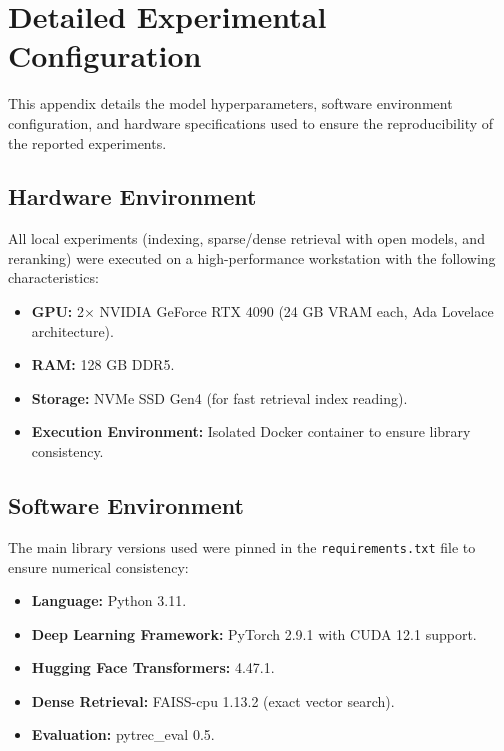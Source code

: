 \documentclass[11pt]{article}
\begin{document}
%


\appendix
\section{Detailed Experimental Configuration}
\label{apx:configuracion}

This appendix details the model hyperparameters, software environment configuration, and hardware specifications used to ensure the reproducibility of the reported experiments.

\subsection{Hardware Environment}

All local experiments (indexing, sparse/dense retrieval with open models, and reranking) were executed on a high-performance workstation with the following characteristics:

\begin{itemize}[nosep]
    \item \textbf{GPU:} 2$\times$ NVIDIA GeForce RTX 4090 (24 GB VRAM each, Ada Lovelace architecture).
    \item \textbf{RAM:} 128 GB DDR5.
    \item \textbf{Storage:} NVMe SSD Gen4 (for fast retrieval index reading).
    \item \textbf{Execution Environment:} Isolated Docker container to ensure library consistency.
\end{itemize}

\subsection{Software Environment}

The main library versions used were pinned in the \texttt{requirements.txt} file to ensure numerical consistency:

\begin{itemize}[nosep]
    \item \textbf{Language:} Python 3.11.
    \item \textbf{Deep Learning Framework:} PyTorch 2.9.1 with CUDA 12.1 support.
    \item \textbf{Hugging Face Transformers:} 4.47.1.
    \item \textbf{Dense Retrieval:} FAISS-cpu 1.13.2 (exact vector search).
    \item \textbf{Evaluation:} pytrec\_eval 0.5.
\end{itemize}
\end{document}
